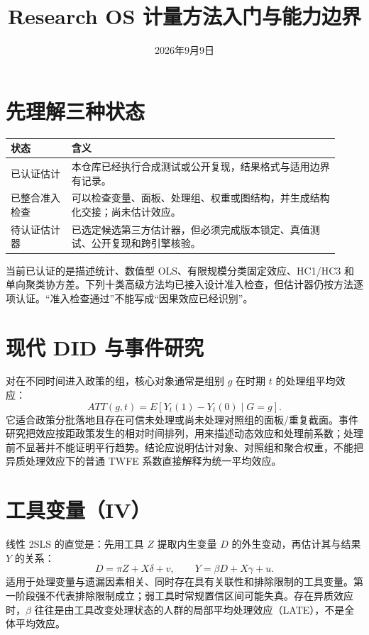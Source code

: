 \documentclass[UTF8]{ctexart}
\title{Research OS 计量方法入门与能力边界}
\author{}
\date{2026年9月9日}
\begin{document}
\maketitle

\section{先理解三种状态}

\begin{longtable}{p{0.17\linewidth}p{0.75\linewidth}}
\toprule
状态 & 含义 \\
\midrule
已认证估计 & 本仓库已经执行合成测试或公开复现，结果格式与适用边界有记录。\\
已整合准入检查 & 可以检查变量、面板、处理组、权重或图结构，并生成结构化交接；尚未估计效应。\\
待认证估计器 & 已选定候选第三方估计器，但必须完成版本锁定、真值测试、公开复现和跨引擎核验。\\
\bottomrule
\end{longtable}

当前已认证的是描述统计、数值型 OLS、有限规模分类固定效应、HC1/HC3 和单向聚类协方差。下列十类高级方法均已接入设计准入检查，但估计器仍按方法逐项认证。``准入检查通过''不能写成``因果效应已经识别''。

\section{现代 DID 与事件研究}

对在不同时间进入政策的组，核心对象通常是组别 $g$ 在时期 $t$ 的处理组平均效应：
\[
ATT(g,t)=E[Y_t(1)-Y_t(0)\mid G=g].
\]
它适合政策分批落地且存在可信未处理或尚未处理对照组的面板/重复截面。事件研究把效应按距政策发生的相对时间排列，用来描述动态效应和处理前系数；处理前不显著并不能证明平行趋势。结论应说明估计对象、对照组和聚合权重，不能把异质处理效应下的普通 TWFE 系数直接解释为统一平均效应。

\section{工具变量（IV）}

线性 2SLS 的直觉是：先用工具 $Z$ 提取内生变量 $D$ 的外生变动，再估计其与结果 $Y$ 的关系：
\[
D=\pi Z+X\delta+v,\qquad Y=\beta D+X\gamma+u.
\]
适用于处理变量与遗漏因素相关、同时存在具有关联性和排除限制的工具变量。第一阶段强不代表排除限制成立；弱工具时常规置信区间可能失真。存在异质效应时，$\beta$ 往往是由工具改变处理状态的人群的局部平均处理效应（LATE），不是全体平均效应。
\end{document}
